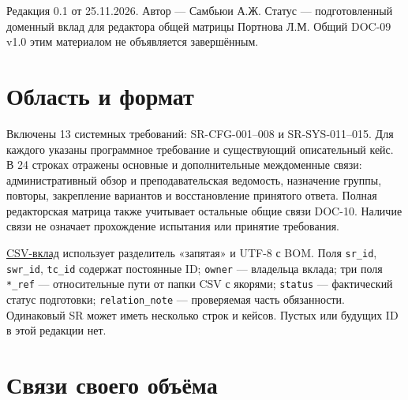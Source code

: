 \documentclass[12pt,a4paper]{article}
\begin{document}
Редакция 0.1 от 25.11.2026. Автор --- Самбьюи А.Ж. Статус --- подготовленный доменный вклад для редактора общей матрицы Портнова Л.М. Общий DOC-09 v1.0 этим материалом не объявляется завершённым.

\section{Область и формат}\label{ux43eux431ux43bux430ux441ux442ux44c-ux438-ux444ux43eux440ux43cux430ux442}

\hypertarget{область-и-формат}{}

Включены 13 системных требований: SR-CFG-001--008 и SR-SYS-011--015. Для каждого указаны программное требование и существующий описательный кейс. В 24 строках отражены основные и дополнительные междоменные связи: административный обзор и преподавательская ведомость, назначение группы, повторы, закрепление вариантов и восстановление принятого ответа. Полная редакторская матрица также учитывает остальные общие связи DOC-10. Наличие связи не означает прохождение испытания или принятие требования.

\href{https://github.com/Kokorev-VD/mephi-samolety/blob/main/docs/05_\%D0\%A2\%D1\%80\%D0\%B0\%D1\%81\%D1\%81\%D0\%B8\%D1\%80\%D0\%BE\%D0\%B2\%D0\%BA\%D0\%B0/DOC-09_\%D0\%92\%D0\%BA\%D0\%BB\%D0\%B0\%D0\%B4_\%D0\%A1\%D0\%B0\%D0\%BC\%D0\%B1\%D1\%8C\%D1\%8E\%D0\%B8.csv}{CSV-вклад} использует разделитель «запятая» и UTF-8 с BOM. Поля \texttt{sr\_id}, \texttt{swr\_id}, \texttt{tc\_id} содержат постоянные ID; \texttt{owner} --- владельца вклада; три поля \texttt{*\_ref} --- относительные пути от папки CSV с якорями; \texttt{status} --- фактический статус подготовки; \texttt{relation\_\allowbreak{}note} --- проверяемая часть обязанности. Одинаковый SR может иметь несколько строк и кейсов. Пустых или будущих ID в этой редакции нет.

\section{Связи своего объёма}\label{ux441ux432ux44fux437ux438-ux441ux432ux43eux435ux433ux43e-ux43eux431ux44aux451ux43cux430}

\hypertarget{связи-своего-объёма}{}
\end{document}
